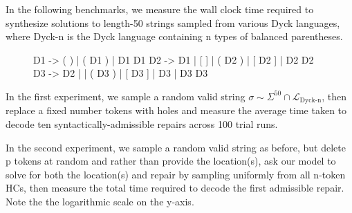 \documentclass[sigplan,review,anonymous,acmsmall]{acmart}\settopmatter{printfolios=false,printccs=false,printacmref=false}
\begin{document}
In the following benchmarks, we measure the wall clock time required to synthesize solutions to length-50 strings sampled from various Dyck languages, where Dyck-n is the Dyck language containing n types of balanced parentheses.

\begin{figure}[H]
\begin{tidyinput}
D1 -> ( ) | ( D1 ) | D1 D1
D2 -> D1 | [ ] | ( D2 ) | [ D2 ] | D2 D2
D3 -> D2 | { } | ( D3 ) | [ D3 ] | { D3 } | D3 D3
\end{tidyinput}
\end{figure}

\noindent In the first experiment, we sample a random valid string $\sigma \sim \Sigma^{50} \cap \mathcal{L}_{\text{Dyck-n}}$, then replace a fixed number tokens with holes and measure the average time taken to decode ten syntactically-admissible repairs across 100 trial runs.

\begin{figure}[H]
\hspace{-0.25cm}
\end{figure}

\noindent In the second experiment, we sample a random valid string as before, but delete p tokens at random and rather than provide the location(s), ask our model to solve for both the location(s) and repair by sampling uniformly from all n-token HCs, then measure the total time required to decode the first admissible repair. Note the the logarithmic scale on the y-axis.
\end{document}
